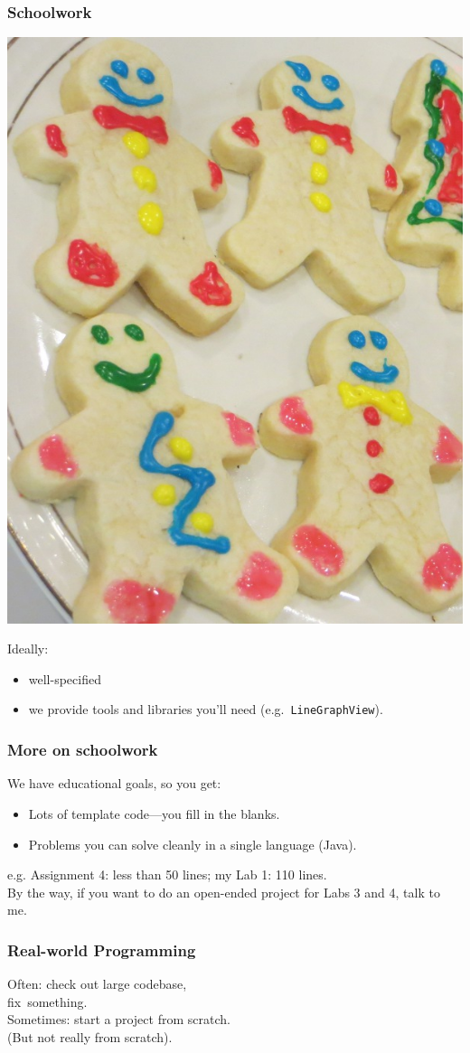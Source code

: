 \begin{frame}
\frametitle{Schoolwork}

\begin{center}
\includegraphics[width=.4\textwidth]{images/1502_cookies}
\end{center}

\begin{changemargin}{1cm}
Ideally:
\begin{itemize}
\item well-specified
\item we provide tools and libraries you'll need (e.g.~{\tt LineGraphView}).
\end{itemize}
\end{changemargin}

\end{frame}

\begin{frame}
\frametitle{More on schoolwork}

\begin{changemargin}{1.5cm}
We have educational goals, so you get:
\begin{itemize}
\item Lots of template code---you fill in the blanks.
\item Problems you can solve cleanly in a single language (Java).
\end{itemize}

e.g. Assignment 4: less than 50 lines; my Lab 1: 110 lines.\\[1em]

By the way, if you want to do an open-ended project for Labs 3 and 4,
talk to me.

\end{changemargin}

\end{frame}

\begin{frame}
\frametitle{Real-world Programming}

\Large
\begin{changemargin}{2cm}
Often: check out large codebase, \\ \qquad fix~something.\\[1em]

Sometimes: start a project from scratch.\\
\qquad (But not really from scratch).
\end{changemargin}
\end{frame}

